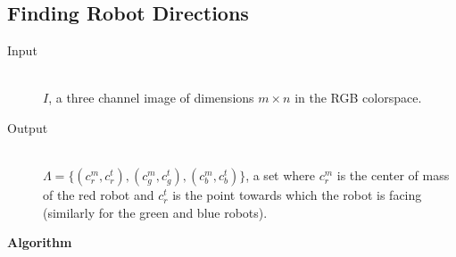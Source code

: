 \documentclass[10pt,a4paper]{article}
\begin{document}
\subsection{Finding Robot Directions}\label{directionalgo}
\begin{description}
\item[Input] \hfill \\
    $I$, a three channel image of dimensions $m \times n$ in the RGB colorspace.
\item[Output] \hfill \\
    $\Lambda = \{(c^m_r, c^t_r), (c^m_g, c^t_g), (c^m_b, c^t_b)\}$, a set where
    $c^m_r$ is the center of mass of the red robot and $c^t_r$ is the point 
    towards which the robot is facing (similarly for the green and blue robots).
\end{description}
\textbf{Algorithm}
\end{document}
